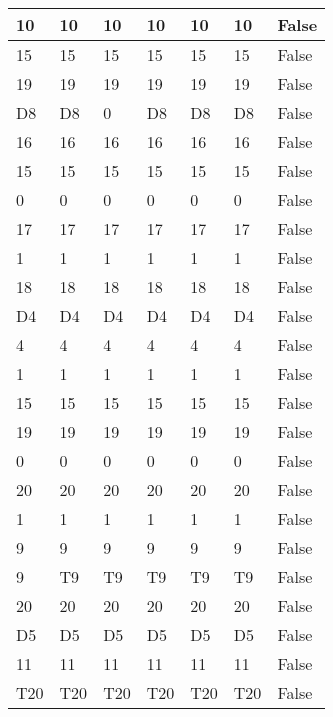 \begin{longtable}[htbp]{| p{} | p{} | p{}| p{}| p{}| p{}| p{}|}
10 & 10 & 10 & 10 & 10 & 10 & False \\ \hline
15 & 15 & 15 & 15 & 15 & 15 & False \\ \hline
19 & 19 & 19 & 19 & 19 & 19 & False \\ \hline
\multicolumn{1}{|l|}{D8} & \multicolumn{1}{l|}{D8} & 0 & \multicolumn{1}{l|}{D8} & \multicolumn{1}{l|}{D8} & \multicolumn{1}{l|}{D8} & False \\ \hline
16 & 16 & 16 & 16 & 16 & 16 & False \\ \hline
15 & 15 & 15 & 15 & 15 & 15 & False \\ \hline
0 & 0 & 0 & 0 & 0 & 0 & False \\ \hline
17 & 17 & 17 & 17 & 17 & 17 & False \\ \hline
1 & 1 & 1 & 1 & 1 & 1 & False \\ \hline
18 & 18 & 18 & 18 & 18 & 18 & False \\ \hline
\multicolumn{1}{|l|}{D4} & \multicolumn{1}{l|}{D4} & \multicolumn{1}{l|}{D4} & \multicolumn{1}{l|}{D4} & \multicolumn{1}{l|}{D4} & \multicolumn{1}{l|}{D4} & False \\ \hline
4 & 4 & 4 & 4 & 4 & 4 & False \\ \hline
1 & 1 & 1 & 1 & 1 & 1 & False \\ \hline
15 & 15 & 15 & 15 & 15 & 15 & False \\ \hline
19 & 19 & 19 & 19 & 19 & 19 & False \\ \hline
0 & 0 & 0 & 0 & 0 & 0 & False \\ \hline
20 & 20 & 20 & 20 & 20 & 20 & False \\ \hline
1 & 1 & 1 & 1 & 1 & 1 & False \\ \hline
9 & 9 & 9 & 9 & 9 & 9 & False \\ \hline
9 & \multicolumn{1}{l|}{T9} & \multicolumn{1}{l|}{T9} & \multicolumn{1}{l|}{T9} & \multicolumn{1}{l|}{T9} & \multicolumn{1}{l|}{T9} & False \\ \hline
20 & 20 & 20 & 20 & 20 & 20 & False \\ \hline
\multicolumn{1}{|l|}{D5} & \multicolumn{1}{l|}{D5} & \multicolumn{1}{l|}{D5} & \multicolumn{1}{l|}{D5} & \multicolumn{1}{l|}{D5} & \multicolumn{1}{l|}{D5} & False \\ \hline
11 & 11 & 11 & 11 & 11 & 11 & False \\ \hline
\multicolumn{1}{|l|}{T20} & \multicolumn{1}{l|}{T20} & \multicolumn{1}{l|}{T20} & \multicolumn{1}{l|}{T20} & \multicolumn{1}{l|}{T20} & \multicolumn{1}{l|}{T20} & False \\ \hline

\end{longtable}

